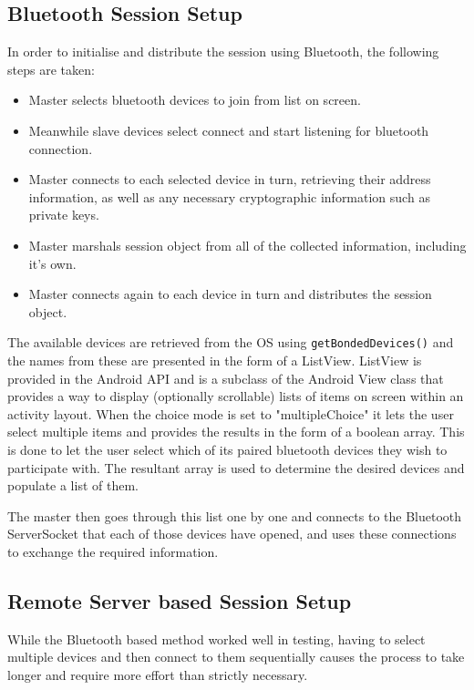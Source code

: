\subsection{Bluetooth Session Setup}
\label{bt setup}
In order to initialise and distribute the session using Bluetooth, the following steps are taken:

\begin{itemize}
\item{Master selects bluetooth devices to join from list on screen.}
\item{Meanwhile slave devices select connect and start listening for bluetooth connection.}
\item{Master connects to each selected device in turn, retrieving their address information, as well as any necessary cryptographic information such as private keys.}
\item{Master marshals session object from all of the collected information, including it's own.}
\item{Master connects again to each device in turn and distributes the session object.}
\end{itemize}

The available devices are retrieved from the OS using {\tt getBondedDevices()} and the names from these are presented in the form of a ListView. ListView is provided in the Android API and is a subclass of the Android View class that provides a way to display (optionally scrollable) lists of items on screen within an activity layout. When the choice mode is set to "multipleChoice" it lets the user select multiple items and provides the results in the form of a boolean array. This is done to let the user select which of its paired bluetooth devices they wish to participate with. The resultant array is used to determine the desired devices and populate a list of them.

The master then goes through this list one by one and connects to the Bluetooth ServerSocket that each of those devices have opened, and uses these connections to exchange the required information.

\subsection{Remote Server based Session Setup}

While the Bluetooth based method worked well in testing, having to select multiple devices and then connect to them sequentially causes the process to take longer and require more effort than strictly necessary.

